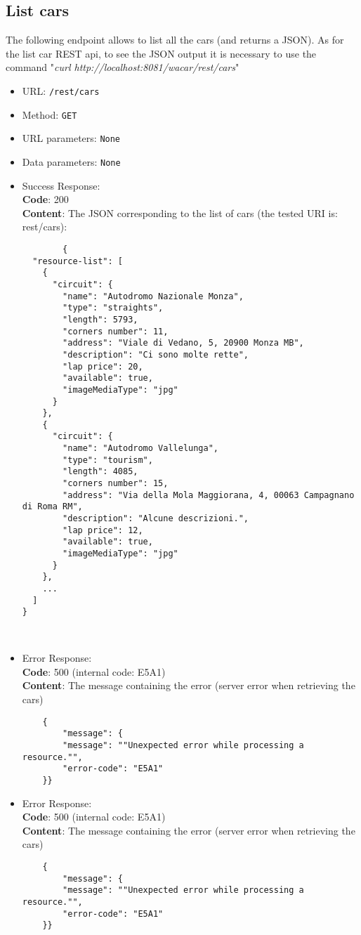 \subsection*{List cars}

The following endpoint allows to list all the cars (and returns a JSON). As for the list car REST api, to see the JSON output it is necessary to use the command "\textit{curl http://localhost:8081/wacar/rest/cars}"

\begin{itemize}
    \item URL: \texttt{/rest/cars}
    \item Method: \texttt{GET}
    \item URL parameters: \texttt{None}
    \item Data parameters: \texttt{None}
    \item Success Response: \\
    \textbf{Code}: 200\\
    \textbf{Content}: The JSON corresponding to the list of cars (the tested URI is: rest/cars):
    \\\begin{verbatim}
		{
  "resource-list": [
    {
      "circuit": {
        "name": "Autodromo Nazionale Monza",
        "type": "straights",
        "length": 5793,
        "corners number": 11,
        "address": "Viale di Vedano, 5, 20900 Monza MB",
        "description": "Ci sono molte rette",
        "lap price": 20,
        "available": true,
        "imageMediaType": "jpg"
      }
    },
    {
      "circuit": {
        "name": "Autodromo Vallelunga",
        "type": "tourism",
        "length": 4085,
        "corners number": 15,
        "address": "Via della Mola Maggiorana, 4, 00063 Campagnano di Roma RM",
        "description": "Alcune descrizioni.",
        "lap price": 12,
        "available": true,
        "imageMediaType": "jpg"
      }
    },
    ...
  ]
}

		  
	\end{verbatim}
    \item Error Response:\\
    \textbf{Code}: 500 (internal code: E5A1)\\
    \textbf{Content}: The message containing the error (server error when retrieving the cars)\\
    \begin{verbatim}
    {
        "message": {
        "message": ""Unexpected error while processing a resource."",
        "error-code": "E5A1"
    }}
    \end{verbatim}
    \item Error Response:\\
    \textbf{Code}: 500 (internal code: E5A1)\\
    \textbf{Content}: The message containing the error (server error when retrieving the cars)\\
    \begin{verbatim}
    {
        "message": {
        "message": ""Unexpected error while processing a resource."",
        "error-code": "E5A1"
    }}
    \end{verbatim}

\end{itemize}

